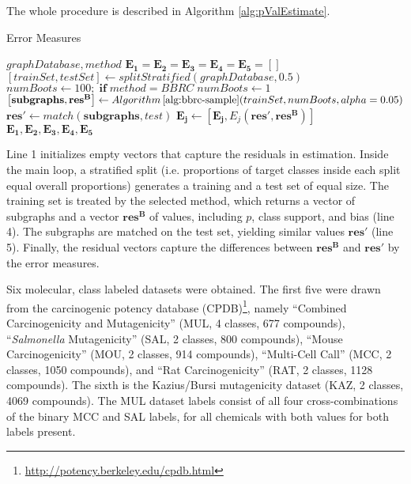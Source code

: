 \documentclass{article}
\begin{document}
The whole procedure is described in Algorithm \ref{alg:pValEstimate}.
\begin{algorithm}[t]
  \caption{Error Measures}
  \label{alg:pValEstimate}
  {\small \begin{algorithmic}[1]
  \Require $graphDatabase, method$ 
  \State $\mathbf{E_1}=\mathbf{E_2}=\mathbf{E_3}=\mathbf{E_4}=\mathbf{E_5}=\left[ \right]$
    \State $[trainSet, testSet] \gets splitStratified(graphDatabase,0.5)$ 
    \State $numBoots \gets 100;\;\textbf{if}\; method=BBRC\; numBoots \gets 1$
    \State $\left[ \mathbf{subgraphs}, \mathbf{res^B} \right] \gets Algorithm\,\ref{alg:bbrc-sample}(trainSet,numBoots,alpha=0.05)$ 
    \State $\mathbf{res'} \gets match(\mathbf{subgraphs}, test)$ 
      \State $ \mathbf{E_j} \gets \left[ \mathbf{E_j}, E_j(\mathbf{res'}, \mathbf{res^B}) \right]$
    \EndFor
  \EndFor
  \Ensure $\mathbf{E_1},\mathbf{E_2},\mathbf{E_3},\mathbf{E_4},\mathbf{E_5}$
\end{algorithmic}}
\end{algorithm}

Line 1 initializes empty vectors that capture the residuals in estimation.
Inside the main loop, a stratified split (i.e. proportions of target classes
inside each split equal overall proportions) generates a training and a test
set of equal size. The training set is treated by the selected method, which
returns a vector of subgraphs and a vector $\mathbf{res^B}$ of values,
including $p$, class support, and bias (line 4). The subgraphs are matched on
the test set, yielding similar values $\mathbf{res'}$ (line 5). Finally, the
residual vectors capture the differences between $\mathbf{res^B}$ and
$\mathbf{res'}$ by the error measures.

Six molecular, class labeled datasets were obtained. The first five were drawn
from the carcinogenic potency database
(CPDB)\footnote{\url{http://potency.berkeley.edu/cpdb.html}}, namely ``Combined
Carcinogenicity and Mutagenicity'' (MUL, 4 classes, 677 compounds),
``\emph{Salmonella} Mutagenicity'' (SAL, 2 classes, 800 compounds), ``Mouse
Carcinogenicity'' (MOU, 2 classes, 914 compounds), ``Multi-Cell Call'' (MCC, 2
classes, 1050 compounds), and ``Rat Carcinogenicity'' (RAT, 2 classes, 1128
compounds). The sixth is the Kazius/Bursi mutagenicity dataset
\cite{kazius05derivation} (KAZ, 2 classes, 4069 compounds).  The MUL dataset
labels consist of all four cross-combinations of the binary MCC and SAL labels,
for all chemicals with both values for both labels present.
\end{document}
